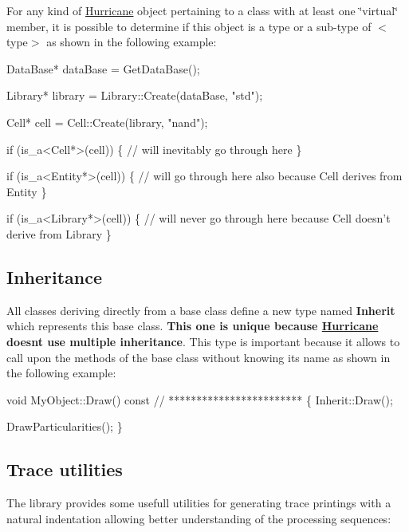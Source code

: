 For any kind of \mbox{\hyperlink{namespaceHurricane}{Hurricane}} object pertaining to a class with at least one \char`\"{}virtual\char`\"{} member, it is possible to determine if this object is a type or a sub-\/type of {\ttfamily $<$type$>$} as shown in the following example\+: 
\begin{DoxyCode}
DataBase* dataBase = GetDataBase();
 
Library* library = Library::Create(dataBase, \textcolor{stringliteral}{"std"});
 
Cell* cell = Cell::Create(library, \textcolor{stringliteral}{"nand"});
 
\textcolor{keywordflow}{if} (is\_a<Cell*>(cell)) \{
   \textcolor{comment}{// will inevitably go through here}
\}
 
\textcolor{keywordflow}{if} (is\_a<Entity*>(cell)) \{
   \textcolor{comment}{// will go through here also because Cell derives from Entity}
\}
 
\textcolor{keywordflow}{if} (is\_a<Library*>(cell)) \{
   \textcolor{comment}{// will never go through here because Cell doesn't derive from Library}
\}
\end{DoxyCode}
\hypertarget{group__Generalities_secGeneralitiesInheritance}{}\subsection{Inheritance}\label{group__Generalities_secGeneralitiesInheritance}
All classes deriving directly from a base class define a new type named {\bfseries Inherit} which represents this base class. {\bfseries This one is unique because \mbox{\hyperlink{namespaceHurricane}{Hurricane}} doesn\textquotesingle{}t use multiple inheritance}. This type is important because it allows to call upon the methods of the base class without knowing its name as shown in the following example\+: 
\begin{DoxyCode}
\textcolor{keywordtype}{void} MyObject::Draw() const
\textcolor{comment}{// ************************}
\{
   Inherit::Draw();
 
   DrawParticularities();
\}
\end{DoxyCode}
\hypertarget{group__Generalities_secGeneralitiesTraceUtilities}{}\subsection{Trace utilities}\label{group__Generalities_secGeneralitiesTraceUtilities}
The library provides some usefull utilities for generating trace printings with a natural indentation allowing better understanding of the processing sequences\+:


